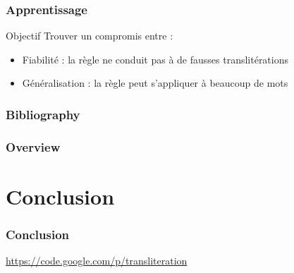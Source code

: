 \documentclass{beamer}
\begin{document}
\begin{frame}
	\frametitle{Apprentissage}

	\begin{block}{Objectif}
	Trouver un compromis entre :
		\begin{itemize}
		\item Fiabilité : la règle ne conduit pas à de fausses translitérations
		\item Généralisation : la règle peut s'appliquer à beaucoup de mots
		\end{itemize}			
	\end{block}

	\begin{block}{}
	
	\end{block}

\end{frame}


\begin{frame}
    \frametitle{Bibliography}
    {\fontsize{0.8em}{1em}
    \nocite{*}
    
    }
\end{frame}

\begin{frame}
    \frametitle{Overview}
\end{frame}

\section{Conclusion}
\begin{frame}
    \frametitle{Conclusion}
    \url{https://code.google.com/p/transliteration}
\end{frame}
\end{document}
